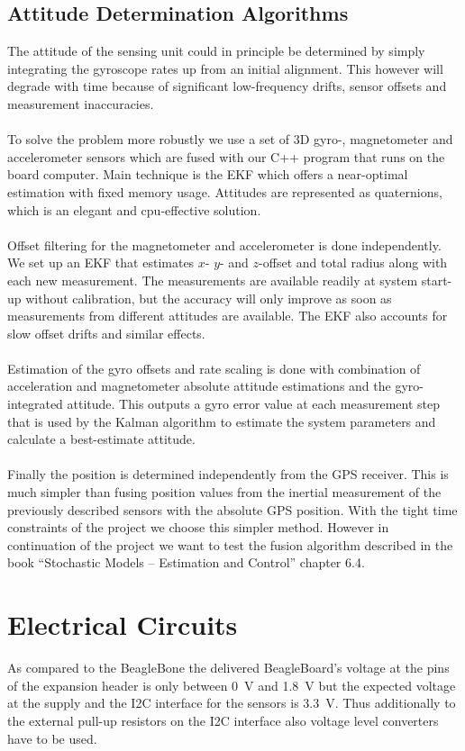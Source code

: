 \subsection{Attitude Determination Algorithms}
The attitude of the sensing unit could in principle be determined by simply integrating the gyroscope rates up from an initial alignment. This however will degrade with time because of significant low-frequency drifts, sensor offsets and measurement inaccuracies.
\\
\\
To solve the problem more robustly we use a set of 3D gyro-, magnetometer and accelerometer sensors which are fused with our C++ program that runs on the board computer. Main technique is the \ac{EKF} which offers a near-optimal estimation with fixed memory usage. Attitudes are represented as quaternions, which is an elegant and cpu-effective solution.
\\
\\
Offset filtering for the magnetometer and accelerometer is done independently.
We set up an \ac{EKF} that estimates $x$- $y$- and $z$-offset and total radius along with each new measurement.
The measurements are available readily at system start-up without calibration, but the accuracy will only improve as soon as measurements from different attitudes are available. The \ac{EKF} also accounts for slow offset drifts and similar effects.
\\
\\
Estimation of the gyro offsets and rate scaling is done with combination of acceleration and magnetometer absolute attitude estimations and the gyro-integrated attitude. This outputs a gyro error value at each measurement step that is used by the Kalman algorithm to estimate the system parameters and calculate a best-estimate attitude.
\\
\\
Finally the position is determined independently from the GPS receiver. This is much simpler than fusing position values from the inertial measurement of the previously described sensors with the absolute GPS position. With the tight time constraints of the project we choose this simpler method. However in continuation of the project we want to test the fusion algorithm described in the book ``Stochastic Models -- Estimation and Control'' chapter 6.4.

\FloatBarrier
\section{Electrical Circuits}

As compared to the BeagleBone the delivered BeagleBoard's voltage at the pins
of the expansion header is only between 0~V and 1.8~V but the expected voltage
at the supply and the I2C interface for the sensors is 3.3~V. Thus additionally to
the external pull-up resistors on the I2C interface also voltage level
converters have to be used.
